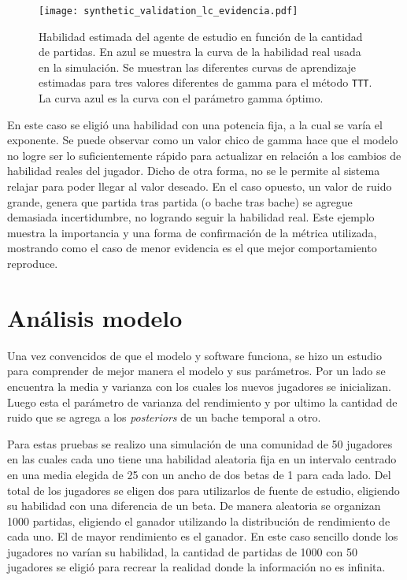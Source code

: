 \documentclass[11pt,twoside, spanish]{report} %
\begin{document}
\begin{figure}[H]
	\centering
	\texttt{[image: synthetic\_validation\_lc\_evidencia.pdf]}
	\caption{Habilidad estimada del agente de estudio en funci\'on de la cantidad de partidas.
	En azul se muestra la curva de la habilidad real usada en la simulaci\'on.
	Se muestran las diferentes curvas de aprendizaje estimadas para tres valores diferentes de gamma para el m\'etodo \texttt{TTT}.
	La curva azul es la curva con el par\'ametro gamma \'optimo.}
	\label{fig:lcVSevi}
\end{figure}

En este caso se eligi\'o una habilidad con una potencia fija, a la cual se var\'ia el exponente.
Se puede observar como un valor chico de gamma hace que el modelo no logre ser lo suficientemente r\'apido para actualizar en relaci\'on a los cambios de habilidad reales del jugador.
Dicho de otra forma, no se le permite al sistema relajar para poder llegar al valor deseado.
En el caso opuesto, un valor de ruido grande, genera que partida tras partida (o bache tras bache) se agregue demasiada incertidumbre, no logrando seguir la habilidad real.
Este ejemplo muestra la importancia y una forma de confirmaci\'on de la m\'etrica utilizada, mostrando como el caso de menor evidencia es el que mejor comportamiento reproduce.

\section{An\'alisis modelo}

Una vez convencidos de que el modelo y software funciona, se hizo un estudio para comprender de mejor manera el modelo y sus par\'ametros.
Por un lado se encuentra la media y varianza con los cuales los nuevos jugadores se inicializan.
Luego esta el par\'ametro de varianza del rendimiento y por ultimo la cantidad de ruido que se agrega a los \textit{posteriors} de un bache temporal a otro.

Para estas pruebas se realizo una simulaci\'on de una comunidad de 50 jugadores en las cuales cada uno tiene una habilidad aleatoria fija en un intervalo centrado en una media elegida de 25 con un ancho de dos betas de 1 para cada lado.
Del total de los jugadores se eligen dos para utilizarlos de fuente de estudio, eligiendo su habilidad con una diferencia de un beta.
De manera aleatoria se organizan 1000 partidas, eligiendo el ganador utilizando la distribuci\'on de rendimiento de cada uno.
El de mayor rendimiento es el ganador.
En este caso sencillo donde los jugadores no var\'ian su habilidad, la cantidad de partidas de 1000 con 50 jugadores se eligi\'o para recrear la realidad donde la informaci\'on no es infinita.
\end{document}
